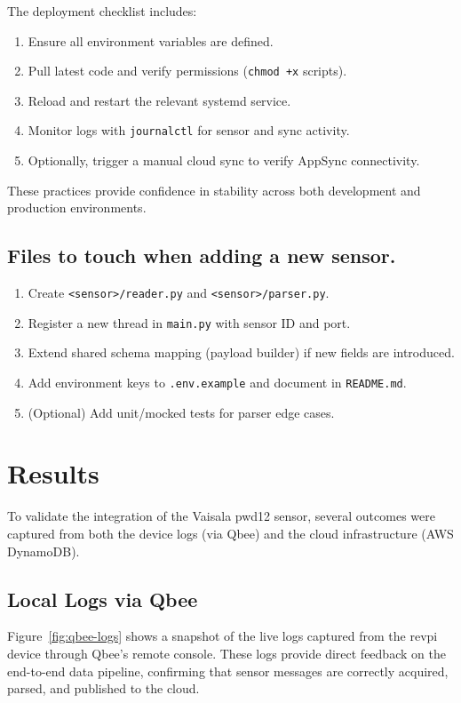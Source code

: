 The deployment checklist includes:
\begin{enumerate}
    \item Ensure all environment variables are defined.
    \item Pull latest code and verify permissions (\texttt{chmod +x} scripts).
    \item Reload and restart the relevant systemd service.
    \item Monitor logs with \texttt{journalctl} for sensor and sync activity.
    \item Optionally, trigger a manual cloud sync to verify AppSync connectivity.
\end{enumerate}

These practices provide confidence in stability across both development and production environments.

\subsection{Files to touch when adding a new sensor.}
\begin{enumerate}
  \item Create \texttt{<sensor>/reader.py} and \texttt{<sensor>/parser.py}.
  \item Register a new thread in \texttt{main.py} with sensor ID and port.
  \item Extend shared schema mapping (payload builder) if new fields are introduced.
  \item Add environment keys to \texttt{.env.example} and document in \texttt{README.md}.
  \item (Optional) Add unit/mocked tests for parser edge cases.
\end{enumerate}


\section{Results}

To validate the integration of the Vaisala \gls{pwd12} sensor, several outcomes were captured from both the device logs (via Qbee) and the cloud infrastructure (AWS DynamoDB).

\subsection{Local Logs via Qbee}

Figure~\ref{fig:qbee-logs} shows a snapshot of the live logs captured from the
\gls{revpi} device through Qbee’s remote console. These logs provide direct
feedback on the end-to-end data pipeline, confirming that sensor messages are
correctly acquired, parsed, and published to the cloud.

